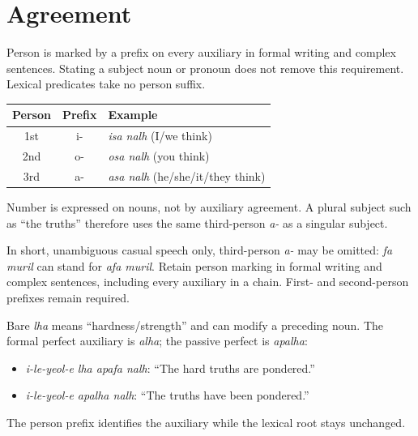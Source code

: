 \section{Agreement}

Person is marked by a prefix on every auxiliary in formal writing and complex sentences. Stating a subject noun or pronoun does not remove this requirement. Lexical predicates take no person suffix.

\begin{center}
\begin{tabular}{c|c|l}
\textbf{Person} & \textbf{Prefix} & \textbf{Example} \\\hline
1st & i- & \textit{isa nalh} (I/we think) \\
2nd & o- & \textit{osa nalh} (you think) \\
3rd & a- & \textit{asa nalh} (he/she/it/they think) \\
\end{tabular}
\end{center}

Number is expressed on nouns, not by auxiliary agreement. A plural subject such as ``the truths'' therefore uses the same third-person \textit{a-} as a singular subject.

In short, unambiguous casual speech only, third-person \textit{a-} may be omitted: \textit{fa muril} can stand for \textit{afa muril}. Retain person marking in formal writing and complex sentences, including every auxiliary in a chain. First- and second-person prefixes remain required.

Bare \textit{lha} means ``hardness/strength'' and can modify a preceding noun. The formal perfect auxiliary is \textit{alha}; the passive perfect is \textit{apalha}:
\begin{itemize}
\item \textit{i-le-yeol-e lha apafa nalh}: ``The hard truths are pondered.''
\item \textit{i-le-yeol-e apalha nalh}: ``The truths have been pondered.''
\end{itemize}
The person prefix identifies the auxiliary while the lexical root stays unchanged.




